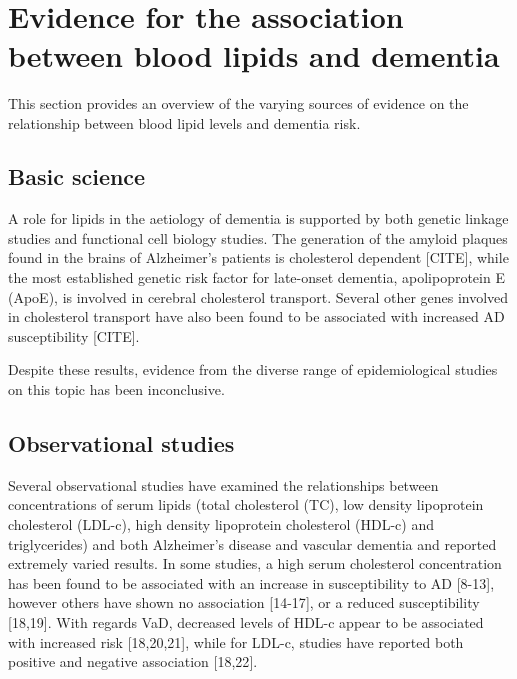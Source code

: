 \documentclass[a4paper, twoside]{templates/ociamthesis}
\begin{document}
~

\hypertarget{evidence-association}{%
\section{Evidence for the association between blood lipids and dementia}\label{evidence-association}}

This section provides an overview of the varying sources of evidence on the relationship between blood lipid levels and dementia risk.

\hypertarget{basic-science}{%
\subsection{Basic science}\label{basic-science}}

A role for lipids in the aetiology of dementia is supported by both genetic linkage studies and functional cell biology studies. The generation of the amyloid plaques found in the brains of Alzheimer's patients is cholesterol dependent {[}CITE{]}, while the most established genetic risk factor for late-onset dementia, apolipoprotein E (ApoE), is involved in cerebral cholesterol transport. Several other genes involved in cholesterol transport have also been found to be associated with increased AD susceptibility {[}CITE{]}.

Despite these results, evidence from the diverse range of epidemiological studies on this topic has been inconclusive.

\hypertarget{observational-studies}{%
\subsection{Observational studies}\label{observational-studies}}

Several observational studies have examined the relationships between concentrations of serum lipids (total cholesterol (TC), low density lipoprotein cholesterol (LDL-c), high density lipoprotein cholesterol (HDL-c) and triglycerides) and both Alzheimer's disease and vascular dementia and reported extremely varied results. In some studies, a high serum cholesterol concentration has been found to be associated with an increase in susceptibility to AD {[}8-13{]}, however others have shown no association {[}14-17{]}, or a reduced susceptibility {[}18,19{]}. With regards VaD, decreased levels of HDL-c appear to be associated with increased risk {[}18,20,21{]}, while for LDL-c, studies have reported both positive and negative association {[}18,22{]}.
\end{document}
